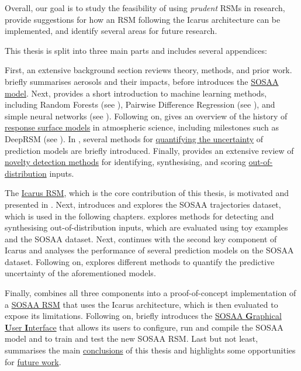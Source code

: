\noindent Overall, our goal is to study the feasibility of using \textit{prudent} RSMs in research, provide suggestions for how an RSM following the Icarus architecture can be implemented, and identify several areas for future research.

\newpar This thesis is split into three main parts and includes several appendices:

First, an extensive background section reviews theory, methods, and prior work.  briefly summarises aerosols and their impacts, before  introduces the \ul{SOSAA model}. Next,  provides a short introduction to machine learning methods, including Random Forests (see ), Pairwise Difference Regression (see ), and simple neural networks (see ). Following on,  gives an overview of the history of \ul{response surface models} in atmospheric science, including milestones such as DeepRSM (see ). In , several methods for \ul{quantifying the uncertainty} of prediction models are briefly introduced. Finally,  provides an extensive review of \ul{novelty detection methods} for identifying, synthesising, and scoring \ul{out-of-distribution} inputs.

The \ul{Icarus RSM}, which is the core contribution of this thesis, is motivated and presented in . Next,  introduces and explores the SOSAA trajectories dataset, which is used in the following chapters.  explores methods for detecting and synthesising out-of-distribution inputs, which are evaluated using toy examples and the SOSAA dataset. Next,  continues with the second key component of Icarus and analyses the performance of several prediction models on the SOSAA dataset. Following on,  explores different methods to quantify the predictive uncertainty of the aforementioned models.

Finally,  combines all three components into a proof-of-concept implementation of a \ul{SOSAA RSM} that uses the Icarus architecture, which is then evaluated to expose its limitations. Following on,  briefly introduces the \ul{SOSAA \textbf{G}raphical \textbf{U}ser \textbf{I}nterface} that allows its users to configure, run and compile the SOSAA model and to train and test the new SOSAA RSM. Last but not least,  summarises the main \ul{conclusions} of this thesis and highlights some opportunities for \ul{future work}.

